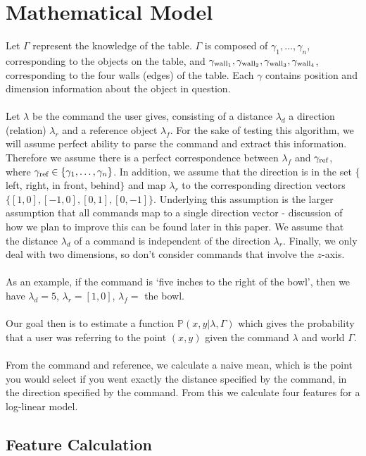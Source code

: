\documentclass[12pt,letterpaper]{article}
\newcommand\refobj{\textmd{ref}}
\begin{document}
\section{Mathematical Model}
Let $\Gamma$ represent the knowledge of the table. $\Gamma$ is composed of $\gamma_1, \ldots, \gamma_n$, corresponding to the objects on the table, and $\gamma_{\textmd{wall}_1}, \gamma_{\textmd{wall}_2}, \gamma_{\textmd{wall}_3}, \gamma_{\textmd{wall}_4}$, corresponding to the four walls (edges) of the table. Each $\gamma$ contains position and dimension information about the object in question.   \\
\\
Let $\lambda$ be the command the user gives, consisting of a distance $\lambda_d$ a direction (relation) $\lambda_r$ and a reference object $\lambda_f$. For the sake of testing this algorithm, we will assume perfect ability to parse the command and extract this information. Therefore we assume there is a perfect correspondence between $\lambda_f$ and $\gamma_\refobj$, where $\gamma_\refobj \in \{\gamma_1, \ldots, \gamma_n\}$. In addition, we assume that the direction is in the set $\{$left, right, in front, behind$\}$ and map $\lambda_r$ to the corresponding direction vectors $\{[1, 0], [-1, 0], [0, 1], [0, -1]\}$.  Underlying this assumption is the larger assumption that all commands map to a single direction vector - discussion of how we plan to improve this can be found later in this paper. We assume that the distance $\lambda_d$ of a command is independent of the direction $\lambda_r$. Finally, we only deal with two dimensions, so don't consider commands that involve the $z$-axis. \\
\\
As an example, if the command is `five inches to the right of the bowl', then we have $\lambda_d = 5$, $\lambda_r = [1, 0]$, $\lambda_f = $ the bowl. \\
\\
Our goal then is to estimate a function $\mathbb{P}(x, y | \lambda, \Gamma)$ which gives the probability that a user was referring to the point $(x, y)$ given the command $\lambda$ and world $\Gamma$. \\
\\
From the command and reference, we calculate a naive mean, which is the point you would select if you went exactly the distance specified by the command, in the direction specified by the command. From this we calculate four features for a log-linear model. 

\subsection{Feature Calculation}
\end{document}
